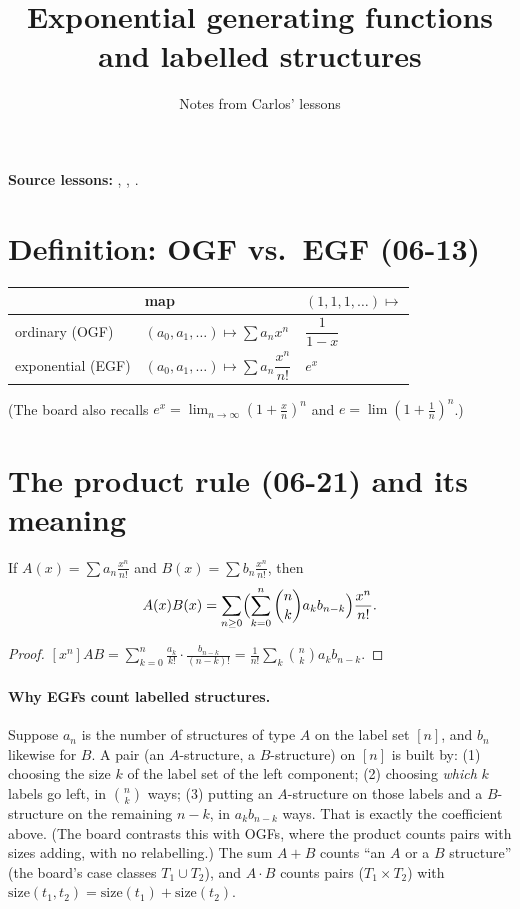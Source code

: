 \documentclass[11pt]{article}
\title{Exponential generating functions\\ and labelled structures}
\author{Notes from Carlos' lessons}
\date{}
\begin{document}
\maketitle

\textbf{Source lessons:}
,
,
.

\section{Definition: OGF vs.\ EGF (06-13)}

\begin{center}
\begin{tabular}{@{}lll@{}}
\toprule
 & map & $(1,1,1,\dots)\mapsto$\\
\midrule
ordinary (OGF) & $(a_0,a_1,\dots)\mapsto\sum a_nx^n$ & $\dfrac1{1-x}$\\[1.2ex]
exponential (EGF) & $(a_0,a_1,\dots)\mapsto\sum a_n\dfrac{x^n}{n!}$ & $e^x$\\
\bottomrule
\end{tabular}
\end{center}
(The board also recalls $e^x=\lim_{n\to\infty}(1+\frac xn)^n$ and $e=\lim(1+\frac1n)^n$.)

\section{The product rule (06-21) and its meaning}

\begin{claim}
If $A(x)=\sum a_n\frac{x^n}{n!}$ and $B(x)=\sum b_n\frac{x^n}{n!}$, then
\[
A(x)B(x)=\sum_{n\ge0}\Bigl(\sum_{k=0}^n\binom nk a_kb_{n-k}\Bigr)\frac{x^n}{n!}.
\]
\end{claim}
\begin{proof}
$[x^n]AB=\sum_{k=0}^n\frac{a_k}{k!}\cdot\frac{b_{n-k}}{(n-k)!}=\frac1{n!}\sum_k\binom nk a_kb_{n-k}$.
\end{proof}

\paragraph{Why EGFs count labelled structures.} Suppose $a_n$ is the number of structures of type $A$ on the label set $[n]$, and $b_n$ likewise for $B$. A pair (an $A$-structure, a $B$-structure) on $[n]$ is built by: (1) choosing the size $k$ of the label set of the left component; (2) choosing \emph{which} $k$ labels go left, in $\binom nk$ ways; (3) putting an $A$-structure on those labels and a $B$-structure on the remaining $n-k$, in $a_kb_{n-k}$ ways. That is exactly the coefficient above. (The board contrasts this with OGFs, where the product counts pairs with sizes adding, with no relabelling.) The sum $A+B$ counts ``an $A$ or a $B$ structure'' (the board's case classes $T_1\cup T_2$), and $A\cdot B$ counts pairs ($T_1\times T_2$) with $\mathrm{size}(t_1,t_2)=\mathrm{size}(t_1)+\mathrm{size}(t_2)$.
\end{document}
